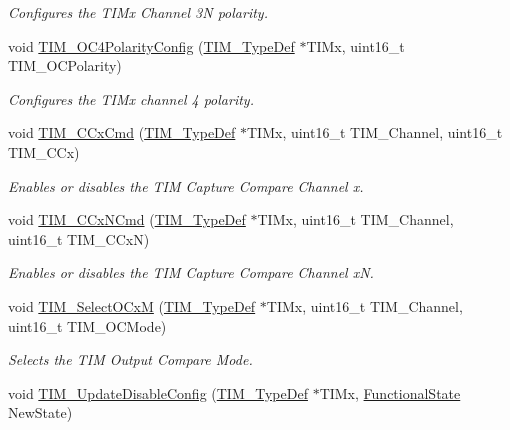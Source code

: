 \begin{DoxyCompactItemize}
\begin{DoxyCompactList}\small\item\em Configures the T\+I\+Mx Channel 3N polarity. \end{DoxyCompactList}\item 
void \mbox{\hyperlink{group___t_i_m___exported___functions_gad678410f7c7244f83daad93ce9d1056e}{T\+I\+M\+\_\+\+O\+C4\+Polarity\+Config}} (\mbox{\hyperlink{struct_t_i_m___type_def}{T\+I\+M\+\_\+\+Type\+Def}} $\ast$T\+I\+Mx, uint16\+\_\+t T\+I\+M\+\_\+\+O\+C\+Polarity)
\begin{DoxyCompactList}\small\item\em Configures the T\+I\+Mx channel 4 polarity. \end{DoxyCompactList}\item 
void \mbox{\hyperlink{group___t_i_m___exported___functions_ga3ecc4647d9ede261beb5e0535cf29ebb}{T\+I\+M\+\_\+\+C\+Cx\+Cmd}} (\mbox{\hyperlink{struct_t_i_m___type_def}{T\+I\+M\+\_\+\+Type\+Def}} $\ast$T\+I\+Mx, uint16\+\_\+t T\+I\+M\+\_\+\+Channel, uint16\+\_\+t T\+I\+M\+\_\+\+C\+Cx)
\begin{DoxyCompactList}\small\item\em Enables or disables the T\+IM Capture Compare Channel x. \end{DoxyCompactList}\item 
void \mbox{\hyperlink{group___t_i_m___exported___functions_ga304ff7c8a1615498da749bf2507e9f2b}{T\+I\+M\+\_\+\+C\+Cx\+N\+Cmd}} (\mbox{\hyperlink{struct_t_i_m___type_def}{T\+I\+M\+\_\+\+Type\+Def}} $\ast$T\+I\+Mx, uint16\+\_\+t T\+I\+M\+\_\+\+Channel, uint16\+\_\+t T\+I\+M\+\_\+\+C\+CxN)
\begin{DoxyCompactList}\small\item\em Enables or disables the T\+IM Capture Compare Channel xN. \end{DoxyCompactList}\item 
void \mbox{\hyperlink{group___t_i_m___exported___functions_ga83ea0af5a7c1af521236ce5e4d2c42b0}{T\+I\+M\+\_\+\+Select\+O\+CxM}} (\mbox{\hyperlink{struct_t_i_m___type_def}{T\+I\+M\+\_\+\+Type\+Def}} $\ast$T\+I\+Mx, uint16\+\_\+t T\+I\+M\+\_\+\+Channel, uint16\+\_\+t T\+I\+M\+\_\+\+O\+C\+Mode)
\begin{DoxyCompactList}\small\item\em Selects the T\+IM Output Compare Mode. \end{DoxyCompactList}\item 
void \mbox{\hyperlink{group___t_i_m___exported___functions_gace2384dd33e849a054f61b8e1fc7e7c3}{T\+I\+M\+\_\+\+Update\+Disable\+Config}} (\mbox{\hyperlink{struct_t_i_m___type_def}{T\+I\+M\+\_\+\+Type\+Def}} $\ast$T\+I\+Mx, \mbox{\hyperlink{group___exported__types_gac9a7e9a35d2513ec15c3b537aaa4fba1}{Functional\+State}} New\+State)

\end{DoxyCompactItemize}
